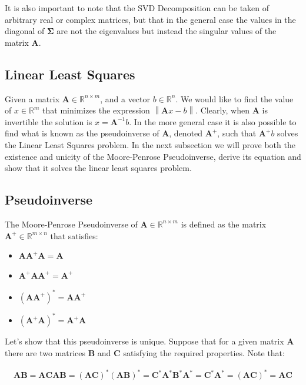 \documentclass{article}
\newcommand{\norm}[1]{\left\lVert#1\right\rVert}
\begin{document}
It is also important to note that the SVD Decomposition can be taken of arbitrary real or complex matrices, but that in the general case the values in the diagonal of $\mathbf{\Sigma}$ are not the eigenvalues but instead the singular values of the matrix $\mathbf{A}$. \\

\subsection{Linear Least Squares}

Given a matrix $\mathbf{A} \in \mathbb{R}^{n \times m}$, and a vector $b \in \mathbb{R}^n$. We would like to find the value of $x \in \mathbb{R}^m$ that minimizes the expression $\norm{\mathbf{A} x - b}$. Clearly, when $\mathbf{A}$ is invertible the solution is $x = \mathbf{A}^{-1} b$. In the more general case it is also possible to find what is known as the pseudoinverse of $\mathbf{A}$, denoted $\mathbf{A}^+$, such that $\mathbf{A}^+ b$ solves the Linear Least Squares problem. In the next subsection we will prove both the existence and unicity of the Moore-Penrose Pseudoinverse, derive its equation and show that it solves the linear least squares problem. \\

\subsection{Pseudoinverse}

The Moore-Penrose Pseudoinverse \cite{CSTheory} of $\mathbf{A} \in \mathbb{R}^{n \times m}$ is defined as the matrix $\mathbf{A}^+ \in \mathbb{R}^{m \times n}$ that satisfies:

\begin{itemize}
\item $\mathbf{A} \mathbf{A}^+ \mathbf{A} = \mathbf{A}$
\item $\mathbf{A}^+ \mathbf{A} \mathbf{A}^+ = \mathbf{A}^+$
\item $(\mathbf{A} \mathbf{A}^+)^* = \mathbf{A} \mathbf{A}^+$
\item $(\mathbf{A}^+ \mathbf{A})^* = \mathbf{A}^+ \mathbf{A}$
\end{itemize}

Let's show that this pseudoinverse is unique. Suppose that for a given matrix $\mathbf{A}$ there are two matrices $\mathbf{B}$ and $\mathbf{C}$ satisfying the required properties. Note that:

\begin{gather*}
\mathbf{A} \mathbf{B} = \mathbf{A} \mathbf{C} \mathbf{A} \mathbf{B} = (\mathbf{A} \mathbf{C})^* (\mathbf{A} \mathbf{B})^* = \mathbf{C}^* \mathbf{A}^* \mathbf{B}^* \mathbf{A}^* = \mathbf{C}^* \mathbf{A}^* = (\mathbf{A} \mathbf{C})^* = \mathbf{A} \mathbf{C} \\
\end{gather*}
\end{document}
